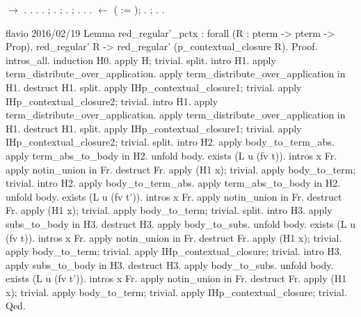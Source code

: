 \documentclass[12pt]{report}
\begin{document}
\begin{coqdoccode}
\coqdocindent{1.00em}
  \ensuremath{\rightarrow}  .\coqdoceol
\coqdocnoindent
{}.\coqdoceol
\coqdocindent{1.00em}
.  .\coqdoceol
\coqdocindent{1.00em}
   ;  .\coqdoceol
\coqdocindent{1.00em}
   ;  .\coqdoceol
\coqdocindent{1.00em}
   ;  .\coqdoceol
\coqdocindent{1.00em}
   .\coqdoceol
\coqdocindent{1.00em}
   .\coqdoceol
\coqdocindent{1.00em}
  \ensuremath{\leftarrow}   ( := ); .\coqdoceol
\coqdocindent{1.00em}
  ; .\coqdoceol
\coqdocnoindent
{}.\coqdoceol
\coqdocemptyline
\end{coqdoccode}
flavio 2016/02/19
 Lemma red\_regular'\_pctx : forall (R : pterm -> pterm -> Prop),
  red\_regular' R -> red\_regular' (p\_contextual\_closure R).
Proof.
  intros\_all. induction H0.
  apply H; trivial. 
  split. intro H1.
  apply term\_distribute\_over\_application.
  apply term\_distribute\_over\_application in H1. 
  destruct H1. split.
  apply IHp\_contextual\_closure1; trivial. 
  apply IHp\_contextual\_closure2; trivial. 
  intro H1.
  apply term\_distribute\_over\_application.
  apply term\_distribute\_over\_application in H1. 
  destruct H1. split.
  apply IHp\_contextual\_closure1; trivial. 
  apply IHp\_contextual\_closure2; trivial. 
  split. intro H2. 
  apply body\_to\_term\_abs. apply term\_abs\_to\_body in H2.
  unfold body. exists (L u (fv t)). intros x Fr.
  apply notin\_union in Fr. destruct Fr. apply (H1 x); trivial.
  apply body\_to\_term; trivial.
  intro H2. 
  apply body\_to\_term\_abs. apply term\_abs\_to\_body in H2.
  unfold body. exists (L u (fv t')). intros x Fr.
  apply notin\_union in Fr. destruct Fr. apply (H1 x); trivial.
  apply body\_to\_term; trivial.
  split. intro H3. apply subs\_to\_body in H3. destruct H3.
  apply body\_to\_subs. unfold body. exists (L u (fv t)). intros x Fr.
  apply notin\_union in Fr. destruct Fr. apply (H1 x); trivial.
  apply body\_to\_term; trivial. apply IHp\_contextual\_closure; trivial.
  intro H3. apply subs\_to\_body in H3. destruct H3.
  apply body\_to\_subs. unfold body. exists (L u (fv t')). intros x Fr.
  apply notin\_union in Fr. destruct Fr. apply (H1 x); trivial.
  apply body\_to\_term; trivial. apply IHp\_contextual\_closure; trivial.
Qed.
\end{document}
